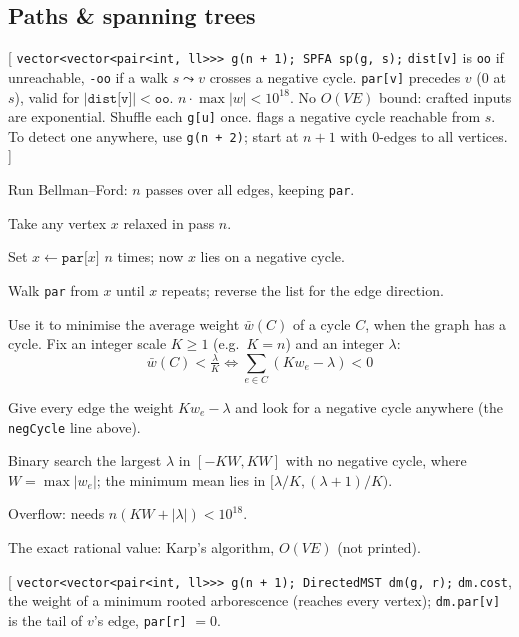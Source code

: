 \subsection{Paths \& spanning trees}
[
	 \texttt{vector<vector<pair<int, ll>>> g(n + 1); SPFA sp(g, s);}
	 \texttt{dist[v]} is \texttt{oo} if unreachable, \texttt{-oo} if a walk $s \leadsto v$ crosses a negative cycle. \texttt{par[v]} precedes $v$ (0 at $s$), valid for $|\texttt{dist[v]}| < \texttt{oo}$.
	 $n \cdot \max |w| < 10^{18}$. No $O(VE)$ bound: crafted inputs are exponential. Shuffle each \texttt{g[u]} once.
	 flags a negative cycle reachable from $s$. To detect one anywhere, use \texttt{g(n + 2)}; start at $n + 1$ with 0-edges to all vertices.
]\label{spfa}
{\footnotesize\tightdisplay
{}
\begin{facts}
	\item Run Bellman--Ford: $n$ passes over all edges, keeping \texttt{par}.
	\item Take any vertex $x$ relaxed in pass $n$.
	\item Set $x \gets \texttt{par[}x\texttt{]}$ $n$ times; now $x$ lies on a negative cycle.
	\item Walk \texttt{par} from $x$ until $x$ repeats; reverse the list for the edge direction.
\end{facts}
Use it to minimise the average weight $\bar w(C)$ of a cycle $C$, when the graph has a cycle. Fix an integer scale $K \ge 1$ (e.g.\ $K = n$) and an integer $\lambda$:
\[ \bar w(C) < \tfrac{\lambda}{K} \iff \textstyle\sum_{e \in C} (K w_e - \lambda) < 0 \]
\begin{facts}
	\item Give every edge the weight $K w_e - \lambda$ and look for a negative cycle anywhere (the \texttt{negCycle} line above).
	\item Binary search the largest $\lambda$ in $[-KW, KW]$ with no negative cycle, where $W = \max |w_e|$; the minimum mean lies in $[\lambda / K, (\lambda + 1) / K)$.
	\item Overflow: needs $n (K W + |\lambda|) < 10^{18}$.
	\item The exact rational value: Karp's algorithm, $O(VE)$ (not printed).
\end{facts}
}
[
	 \texttt{vector<vector<pair<int, ll>>> g(n + 1); DirectedMST dm(g, r);}
	 \texttt{dm.cost}, the weight of a minimum rooted arborescence (reaches every vertex); \texttt{dm.par[v]} is the tail of $v$'s edge, \texttt{par[r]} $= 0$.
